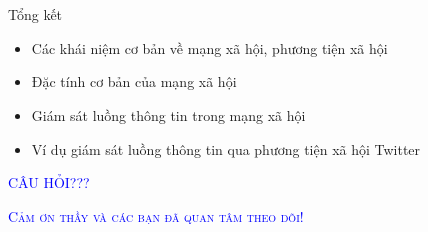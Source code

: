 \documentclass{beamer}
\numberwithin{equation}{section}
\newcommand{\duong}[1]{\textcolor{blue}{#1}}
\begin{document}




\section*{}

\begin{frame}{Tổng kết}
\begin{itemize}
\item Các khái niệm cơ bản về mạng xã hội, phương tiện xã hội
\medskip
\item Đặc tính cơ bản của mạng xã hội
\medskip
\item Giám sát luồng thông tin trong mạng xã hội
\medskip
\item Ví dụ giám sát luồng thông tin qua phương tiện xã hội Twitter
\end{itemize}
\end{frame}

\begin{frame}
\begin{center}
\Huge{\duong{\textsc{CÂU HỎI???}}}
\end{center}
\end{frame}

\begin{frame}
\begin{center}
\Huge{\duong{\textsc{Cảm ơn thầy và các bạn đã quan tâm theo dõi!}}}
\end{center}
\end{frame}
\end{document}
